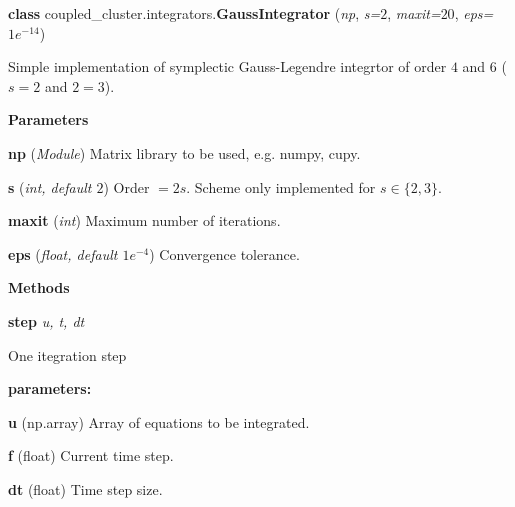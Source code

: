 \begin{tcolorbox}
    {\selectfont
    \textbf{class} coupled\_cluster.integrators.\textbf{GaussIntegrator}
    (\emph{np}, \emph{s=$2$}, \emph{maxit=$20$}, \emph{eps=$1e^{-14}$})

    \vspace{1em}
    Simple implementation of symplectic Gauss-Legendre integrtor
    of order $4$ and $6$ ($s=2$ and $2=3$).
    
    \vspace{1em}
    \textbf{Parameters}

    \hspace{2em} \textbf{np} (\emph{Module})
        Matrix library to be used, e.g. numpy, cupy.

    \hspace{2em} \textbf{s} (\emph{int, default $2$})
        Order $= 2s$. Scheme only implemented for $s\in\{2, 3\}$.

    \hspace{2em} \textbf{maxit} (\emph{int})
        Maximum number of iterations.

    \hspace{2em} \textbf{eps} (\emph{float, default $1e^{-4}$})
        Convergence tolerance.

    \vspace{1em} 
    \textbf{Methods}

    \hspace{2em} \textbf{step} {\emph{u, t, dt}}

        \begin{adjustwidth}{4em}{}
        One itegration step

        \textbf{parameters:} 
        
            \hspace{1.5em} \textbf{u} (np.array) Array of equations to be integrated.

            \hspace{1.5em} \textbf{f} (float) Current time step.

            \hspace{1.5em} \textbf{dt} (float) Time step size.

        \end{adjustwidth}


    } 
\end{tcolorbox}
